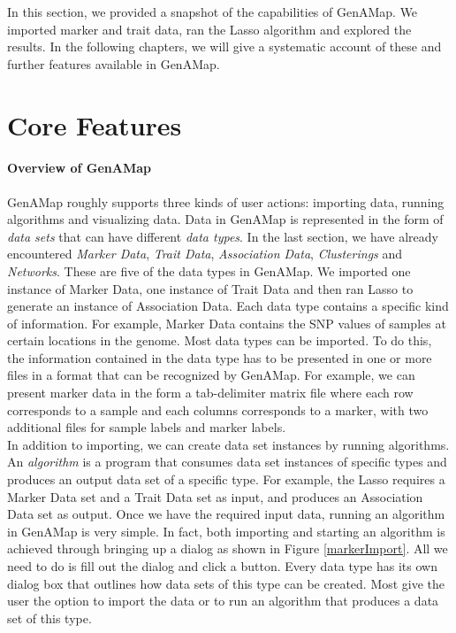 \documentclass{article}
\begin{document}
In this section, we provided a snapshot of the capabilities of GenAMap. We imported marker and trait data, ran the Lasso algorithm and explored the results. In the following chapters, we will give a systematic account of these and further features available in GenAMap.




\section{Core Features}  \label{coreFeatures}

\paragraph{Overview of GenAMap} GenAMap roughly supports three kinds of user actions: importing data, running algorithms and visualizing data. Data in GenAMap is represented in the form of {\it data sets} that can have different {\it data types}. In the last section, we have already encountered {\it Marker Data}, {\it Trait Data}, {\it Association Data}, {\it Clusterings} and {\it Networks}. These are five of the data types in GenAMap. We imported one instance of Marker Data, one instance of Trait Data and then ran Lasso to generate an instance of Association Data. Each data type contains a specific kind of information. For example, Marker Data contains the SNP values of samples at certain locations in the genome. Most data types can be imported. To do this, the information contained in the data type has to be presented in one or more files in a format that can be recognized by GenAMap. For example, we can present marker data in the form a tab-delimiter matrix file where each row corresponds to a sample and each columns corresponds to a marker, with two additional files for sample labels and marker labels.\\

In addition to importing, we can create data set instances by running algorithms. An {\it algorithm} is a program that consumes data set instances of specific types and produces an output data set of a specific type. For example, the Lasso requires a Marker Data set and a Trait Data set as input, and produces an Association Data set as output. Once we have the required input data, running an algorithm in GenAMap is very simple. In fact, both importing and starting an algorithm is achieved through bringing up a dialog as shown in Figure \ref{markerImport}. All we need to do is fill out the dialog and click a button. Every data type has its own dialog box that outlines how data sets of this type can be created. Most give the user the option to import the data or to run an algorithm that produces a data set of this type. \\
\end{document}
